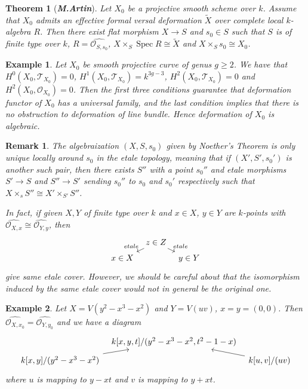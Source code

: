 \documentclass{ctexart}
\newtheorem{remark}{Remark}[section]
\newtheorem{theorem}{Theorem}[section]
\newtheorem{example}{Example}[section]
\newcommand{\spec}{\operatorname{Spec}}
\begin{document}
\begin{theorem}[\textbf{\emph{M.Artin}}]
    Let $X_{0}$ be a projective smooth scheme over $k$.
    Assume that $X_{0}$ admits an effective formal versal deformation $\widetilde{X}$ over complete local $k$-algebra $R$.
    Then there exist flat morphism $X \rightarrow S$ and $s_{0}\in S$ such that $S$ is of finite type over $k$, $R = \widehat{\mathcal{O}_{S, s_{0}}}$, $X \times_{S} \spec R \cong \widetilde{X}$ and $X \times_{S} s_{0} \cong X_{0}$.
\end{theorem}
\begin{example}
    Let $X_{0}$ be smooth projective curve of genus $g \ge 2$.
    We have that $H^{0}(X_{0}, \mathcal{T}_{X_{0}}) = 0$, $H^{1}(X_{0}, \mathcal{T}_{X_{0}}) = k^{3g - 3}$, $H^{2}(X_{0}, \mathcal{T}_{X_{0}}) = 0$ and $H^{2}(X_{0}, \mathcal{O}_{X_{0}}) = 0$.
    Then the first three conditions guarantee that deformation functor of $X_{0}$ has a universal family, 
    and the last condition implies that there is no obstruction to deformation of line bundle.
    Hence deformation of $X_{0}$ is algebraic.
\end{example}
\begin{remark}
    The algebraization $(X, S, s_{0})$ given by Noether's Theorem is only unique locally around $s_{0}$ in the etale topology,
    meaning that if $(X', S', s_{0}')$ is another such pair, then there exists $S''$ with a point $s_{0}''$ and etale morphisms $S' \rightarrow S$ and $S'' \rightarrow S'$ sending $s_{0}''$ to $s_{0}$ and $s_{0}'$ respectively such that $X \times_{s} S'' \cong X' \times_{S'} S''$.
    \par
    In fact, if given $X, Y$ of finite type over $k$ and $x\in X$, $y\in Y$ are $k$-points with $\widehat{\mathcal{O}_{X, x}} \cong \widehat{\mathcal{O}_{Y, y}}$, then
    \begin{equation}
        \begin{tikzcd}[sep = tiny]
            & z\in Z \arrow[dr, "etale"] \arrow[dl, "etale" swap] & \\
            x\in X && y\in Y
        \end{tikzcd}
    \end{equation}
    give same etale cover.
    However, we should be careful about that the isomorphism induced by the same etale cover would not in general be the original one.
\end{remark}
\begin{example}
    Let $X = V(y^{2} - x^{3} - x^{2})$ and $Y = V(uv)$, $x = y = (0, 0)$.
    Then $\widehat{\mathcal{O}_{X, x_{0}}} = \widehat{\mathcal{O}_{Y, y_{0}}}$ and we have a diagram
    \begin{equation}
        \begin{tikzcd}[sep = tiny]
            & k[x, y, t]/(y^{2} - x^{3} - x^{2}, t^{2} - 1 - x) & \\
            k[x, y]/(y^{2} - x^{3} - x^{2}) \arrow[ur] && 
            k[u, v]/(uv) \arrow[ul]
        \end{tikzcd}
    \end{equation}
    where $u$ is mapping to $y - xt$ and $v$ is mapping to $y + xt$.
\end{example}
\end{document}
